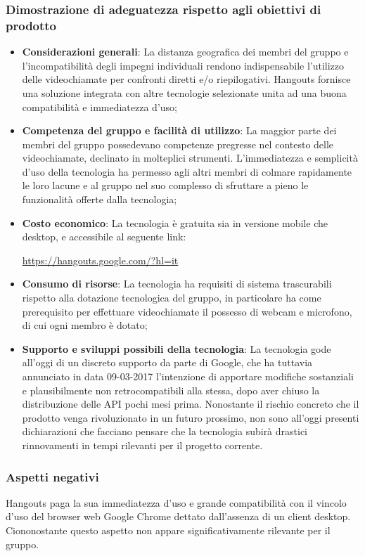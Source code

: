 \documentclass[./../Technology Baseline.tex]{subfiles}
\begin{document}
\subsubsection{Dimostrazione di adeguatezza rispetto agli obiettivi di prodotto}
\begin{itemize}
	\item \textbf{Considerazioni generali}: La distanza geografica dei membri del gruppo e l'incompatibilità degli impegni individuali rendono indispensabile l'utilizzo delle videochiamate per confronti diretti e/o riepilogativi. Hangouts fornisce una soluzione integrata con altre tecnologie selezionate unita ad una buona compatibilità e immediatezza d'uso;
	\item \textbf{Competenza del gruppo e facilità di utilizzo}: La maggior parte dei membri del gruppo possedevano competenze pregresse nel contesto delle videochiamate, declinato in molteplici strumenti. L'immediatezza e semplicità d'uso della tecnologia ha permesso agli altri membri di colmare rapidamente le loro lacune e al gruppo nel suo complesso di sfruttare a pieno le funzionalità offerte dalla tecnologia;
	\item \textbf{Costo economico}: La tecnologia è gratuita sia in versione mobile che desktop, e accessibile al seguente link:
	\begin{center}
		\url{https://hangouts.google.com/?hl=it}
	\end{center}
	\item \textbf{Consumo di risorse}: La tecnologia ha requisiti di sistema trascurabili rispetto alla dotazione tecnologica del gruppo, in particolare ha come prerequisito per effettuare videochiamate il possesso di webcam e microfono, di cui ogni membro è dotato;
	\item \textbf{Supporto e sviluppi possibili della tecnologia}: La tecnologia gode all'oggi di un discreto supporto da parte di Google, che ha tuttavia annunciato in data 09-03-2017 l'intenzione di apportare modifiche sostanziali e plausibilmente non retrocompatibili alla stessa, dopo aver chiuso la distribuzione delle API pochi mesi prima. Nonostante il rischio concreto che il prodotto venga rivoluzionato in un futuro prossimo, non sono all'oggi presenti dichiarazioni che facciano pensare che la tecnologia subirà drastici rinnovamenti in tempi rilevanti per il progetto corrente.
\end{itemize}

\subsubsection{Aspetti negativi}
Hangouts paga la sua immediatezza d'uso e grande compatibilità con il vincolo d'uso del browser web Google Chrome dettato dall'assenza di un client desktop. Ciononostante questo aspetto non appare significativamente rilevante per il gruppo.
\end{document}
